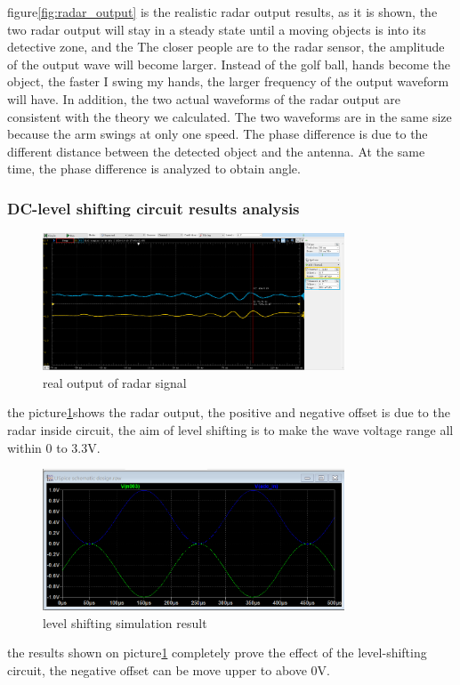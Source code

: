 figure\ref{fig:radar_output} is the realistic radar output results, as it is shown, the two radar output will stay in a steady state until a moving objects is into its detective zone, and the The closer people are to the radar sensor, the amplitude of the output wave will become larger. Instead of the golf ball, hands become the object, the faster I swing my hands, the larger frequency of the output waveform will have.
In addition, the two actual waveforms of the radar output are consistent with the theory we calculated. The two waveforms are in the same size because the arm swings at only one speed. The phase difference is due to the different distance between the detected object and the antenna. At the same time, the phase difference is analyzed to obtain angle.

\subsubsection{DC-level shifting circuit results analysis}
\begin{figure}[h]
\centering
\includegraphics[width=0.8\textwidth]{figure/real output of radar signal.png}
\caption{real output of radar signal}
\label{fig:radar1}
\end{figure}
the picture\ref{fig:radar1}shows the radar output, the positive and negative offset is due to the radar inside circuit, the aim of level shifting is to make the wave voltage range all within 0 to 3.3V.
\begin{figure}[h]
\centering
\includegraphics[width=0.8\textwidth]{figure/level shifting simulation result.png}
\caption{level shifting simulation result}
\label{fig:SHIFT}
\end{figure}
the results shown on picture\ref{fig:radar1} completely prove the effect of the level-shifting circuit, the negative offset can be move upper to above 0V.

